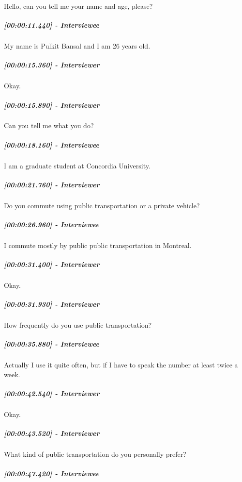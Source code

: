 \documentclass[a4paper,12pt]{article}
\begin{document}
Hello, can you tell me your name and age, please?

\hypertarget{interviewee}{%
\subparagraph{{[}00:00:11.440{]} - Interviewee}\label{interviewee}}

My name is Pulkit Bansal and I am 26 years old.

\hypertarget{interviewer-2}{%
\subparagraph{{[}00:00:15.360{]} - Interviewer}\label{interviewer-2}}

Okay.

\hypertarget{interviewer-3}{%
\subparagraph{{[}00:00:15.890{]} - Interviewer}\label{interviewer-3}}

Can you tell me what you do?

\hypertarget{interviewee-1}{%
\subparagraph{{[}00:00:18.160{]} - Interviewee}\label{interviewee-1}}

I am a graduate student at Concordia University.

\hypertarget{interviewer-4}{%
\subparagraph{{[}00:00:21.760{]} - Interviewer}\label{interviewer-4}}

Do you commute using public transportation or a private vehicle?

\hypertarget{interviewee-2}{%
\subparagraph{{[}00:00:26.960{]} - Interviewee}\label{interviewee-2}}

I commute mostly by public public transportation in Montreal.

\hypertarget{interviewer-5}{%
\subparagraph{{[}00:00:31.400{]} - Interviewer}\label{interviewer-5}}

Okay.

\hypertarget{interviewer-6}{%
\subparagraph{{[}00:00:31.930{]} - Interviewer}\label{interviewer-6}}

How frequently do you use public transportation?

\hypertarget{interviewee-3}{%
\subparagraph{{[}00:00:35.880{]} - Interviewee}\label{interviewee-3}}

Actually I use it quite often, but if I have to speak the number at
least twice a week.

\hypertarget{interviewer-7}{%
\subparagraph{{[}00:00:42.540{]} - Interviewer}\label{interviewer-7}}

Okay.

\hypertarget{interviewer-8}{%
\subparagraph{{[}00:00:43.520{]} - Interviewer}\label{interviewer-8}}

What kind of public transportation do you personally prefer?

\hypertarget{interviewee-4}{%
\subparagraph{{[}00:00:47.420{]} - Interviewee}\label{interviewee-4}}
\end{document}
